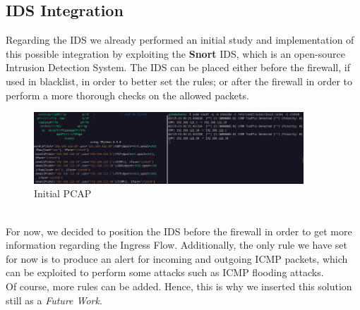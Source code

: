 \documentclass{exam}
\begin{document}
\subsection{IDS Integration}
Regarding the IDS we already performed an initial study and implementation of this possible integration by exploiting the \textbf{Snort} IDS, which is an open-source Intrusion Detection System. The IDS can be placed either before the firewall, if used in blacklist, in order to better set the rules; or after the firewall in order to perform a more thorough checks on the allowed packets.
\begin{figure}[h]
    \centering
    \includegraphics[width=0.9\textwidth]{images/snort.png}
    \caption{Initial PCAP}
\end{figure}
\\For now, we decided to position the IDS before the firewall in order to get more information regarding the Ingress Flow. Additionally, the only rule we have set for now is to produce an alert for incoming and outgoing ICMP packets, which can be exploited to perform some attacks such as ICMP flooding attacks.\\ Of course, more rules can be added. Hence, this is why we inserted this solution still as a \textit{Future Work}.
\end{document}

